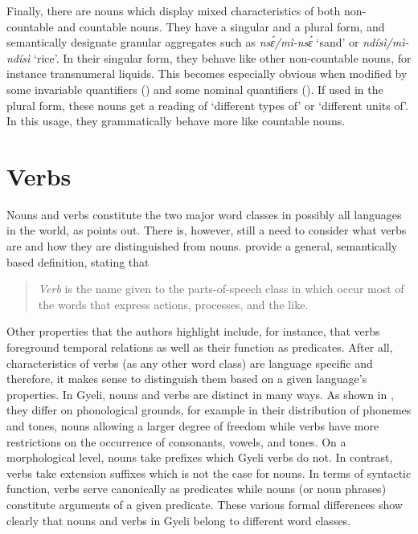 Finally, there are nouns which display mixed characteristics of both non-count\-able and countable nouns. They have a singular and a plural form, and semantically designate granular aggregates such as {\itshape nsɛ́/mì-nsɛ́} `sand' or {\itshape ndísì/mì-ndísì} `rice'. In their singular form, they behave like other non-countable nouns, for instance transnumeral liquids. This becomes especially obvious when modified by some invariable quantifiers () and some nominal quantifiers (). If used in the plural form, these  nouns get a reading of `different types of' or `different units of'. In this usage, they grammatically behave more like countable nouns.









\section{Verbs}
\label{sec:V}



Nouns and verbs constitute the two major word classes in possibly all languages in the world, as \citet[408]{viberg2006} points out. There is, however, still a need to consider what verbs are and how they are distinguished from nouns.  \citet[9]{schachter2007} provide a general, semantically based definition, stating that
\begin{quote}
{\itshape Verb} is the name given to the parts-of-speech class in which occur most of the words that express actions, processes, and the like.
\end{quote}

\noindent Other properties that the authors highlight include, for instance, that verbs foreground temporal relations as well as their function as predicates. After all, characteristics of verbs (as any other word class) are language specific and therefore, it makes sense to distinguish them based on a given language's properties. In Gyeli, nouns and verbs are distinct in many ways. As shown in , they differ on phonological grounds, for example in their distribution of phonemes and tones, nouns allowing a larger degree of freedom while verbs have more restrictions on the occurrence of consonants, vowels, and tones. On a morphological level, nouns take prefixes which Gyeli verbs do not. In contrast, verbs take extension suffixes which is not the case for nouns. In terms of syntactic function, verbs serve canonically as predicates while nouns (or noun phrases) constitute arguments of a given predicate. These various formal differences show clearly that nouns and verbs in Gyeli belong to different word classes.


